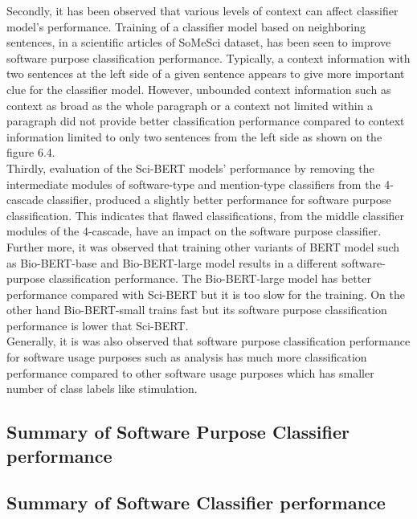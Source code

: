 Secondly, it has been observed that various levels of context can affect classifier model's performance. Training of a classifier model based on neighboring sentences, in a scientific articles of SoMeSci dataset, has been seen to improve software purpose classification performance. Typically, a context information with two sentences at the left side of a given sentence appears to give more important clue for the classifier model. However, unbounded context information such as context as broad as the whole paragraph or a context not limited within a paragraph did not provide better classification performance compared to context information limited to only two sentences from the left side as shown on the figure 6.4. \\


Thirdly, evaluation of the Sci-BERT models' performance by removing the intermediate modules of software-type and mention-type classifiers from the 4-cascade classifier, produced a slightly better performance for software purpose classification.  This indicates that flawed classifications, from the middle classifier modules of the 4-cascade, have an impact on the software purpose classifier. \\

Further more, it was observed that training other variants of BERT model such as Bio-BERT-base and Bio-BERT-large model results in a different software-purpose classification performance. The Bio-BERT-large model has better performance compared with Sci-BERT but it is too slow for the training. On the other hand Bio-BERT-small trains fast but its software purpose classification performance is lower that Sci-BERT. \\


Generally, it is was also observed that software purpose classification performance for software usage purposes such as analysis has much more classification performance compared to other software usage purposes which has smaller number of class labels like stimulation.



\subsection{Summary of Software Purpose Classifier performance}
\label{sec:chapter06:summary_softPurpose}

\subsection{Summary of Software Classifier performance}
\label{sec:chapter06:summary_soft}



















